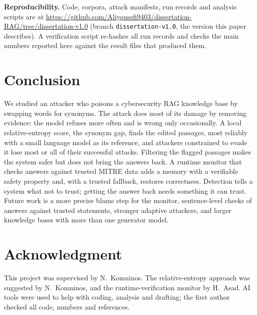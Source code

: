 \documentclass[10pt,journal,compsoc]{IEEEtran}
\begin{document}
\textbf{Reproducibility.} Code, corpora, attack manifests, run records and analysis scripts are at \url{https://github.com/Aliyousefi9403/dissertation-RAG/tree/dissertation-v1.0} (branch \texttt{dissertation-v1.0}, the version this paper describes). A verification script re-hashes all run records and checks the main numbers reported here against the result files that produced them.

\section{Conclusion}\label{sec:conclusion}
We studied an attacker who poisons a cybersecurity RAG knowledge base by swapping words for synonyms. The attack does most of its damage by removing evidence: the model refuses more often and is wrong only occasionally. A local relative-entropy score, the synonym gap, finds the edited passages, most reliably with a small language model as its reference, and attackers constrained to evade it lose most or all of their successful attacks. Filtering the flagged passages makes the system safer but does not bring the answers back. A runtime monitor that checks answers against trusted MITRE data adds a memory with a verifiable safety property and, with a trusted fallback, restores correctness. Detection tells a system what not to trust; getting the answer back needs something it can trust. Future work is a more precise blame step for the monitor, sentence-level checks of answers against trusted statements, stronger adaptive attackers, and larger knowledge bases with more than one generator model.

\section*{Acknowledgment}
This project was supervised by N.~Komninos. The relative-entropy approach was suggested by N.~Komninos, and the runtime-verification monitor by H.~Asad. AI tools were used to help with coding, analysis and drafting; the first author checked all code, numbers and references.



\end{document}

